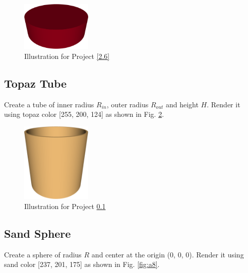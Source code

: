 \begin{figure}[!ht]
\begin{center}
\includegraphics[width=0.3\textwidth]{img/a6-carmine-cylinder.png}
\end{center}
\vspace{-2mm}
\caption{Illustration for Project \ref{2.6}}
\label{fig:a6}
\end{figure}



\subsection{Topaz Tube}\label{2.7}
Create a tube of inner radius $R_{in}$, outer radius $R_{out}$
and height $H$. Render it using topaz color [255, 200, 124]
as shown in Fig. \ref{fig:a7}.

\begin{figure}[!ht]
\begin{center}
\includegraphics[width=0.3\textwidth]{img/a7-topaz-tube.png}
\end{center}
\vspace{-2mm}
\caption{Illustration for Project \ref{2.7}}
\label{fig:a7}
\end{figure}



\subsection{Sand Sphere}\label{2.8}
Create a sphere of radius $R$ and center at the origin (0, 0, 0). 
Render it using sand color [237, 201, 175]
as shown in Fig. \ref{fig:a8}.
\newpage

